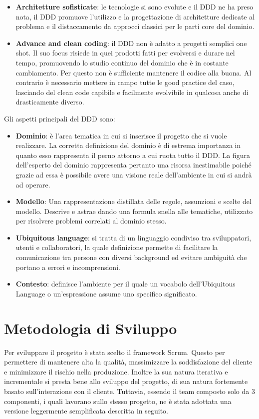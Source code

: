 \begin{itemize}
        \item \textbf{Architetture sofisticate}: le tecnologie si sono evolute e il DDD ne ha preso nota, il DDD promuove l'utilizzo e la progettazione di architetture dedicate al problema e il distaccamento da approcci classici per le parti core del dominio.
        
        \item \textbf{Advance and clean coding}: il DDD non è adatto a progetti semplici one shot. Il suo focus risiede in quei prodotti fatti per evolversi e durare nel tempo, promuovendo lo studio continuo del dominio che è in costante cambiamento. Per questo non è sufficiente mantenere il codice alla buona. Al contrario è necessario mettere in campo tutte le good practice del caso, lasciando del clean code capibile e facilmente evolvibile in qualcosa anche di drasticamente diverso. 
        
        
    \end{itemize}

 
    Gli aspetti principali del DDD sono:
    \begin{itemize}
        \item \textbf{Dominio}: è l'area tematica in cui si inserisce il progetto che si vuole realizzare. La corretta definizione del dominio è di estrema importanza in quanto esso rappresenta il perno attorno a cui ruota tutto il DDD. La figura dell'esperto del dominio rappresenta pertanto una risorsa inestimabile poiché grazie ad essa è possibile avere una visione reale dell'ambiente in cui si andrà ad operare. 
        \item \textbf{Modello}: Una rappresentazione distillata delle regole, assunzioni e scelte del modello. Descrive e astrae dando una formula snella alle tematiche, utilizzato per risolvere problemi correlati al dominio stesso.
        \item \textbf{Ubiquitous language}: si tratta di un linguaggio condiviso tra sviluppatori, utenti e collaboratori, la quale definizione permette di facilitare la comunicazione tra persone con diversi background ed evitare ambiguità che portano a errori e incomprensioni.
        \item \textbf{Contesto}: definisce l'ambiente per il quale un vocabolo dell'Ubiquitous Language o un'espressione assume uno specifico significato.
    \end{itemize}

\section{Metodologia di Sviluppo}
Per sviluppare il progetto è stata scelto il framework Scrum. Questo per permettere di mantenere alta la qualità, massimizzare la soddisfazione del cliente e minimizzare il rischio nella produzione. Inoltre la sua natura iterativa e incrementale si presta bene allo sviluppo del progetto, di sua natura fortemente basato sull'interazione con il cliente. Tuttavia, essendo il team composto solo da 3 componenti, i quali lavorano sullo stesso progetto, ne è stata adottata una versione leggermente semplificata descritta in seguito. 
